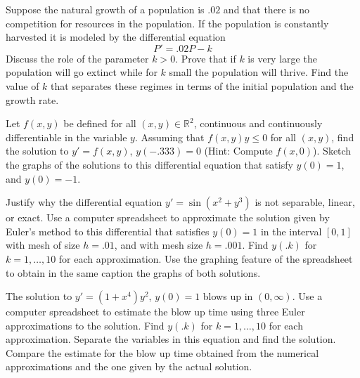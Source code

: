 \documentclass[12pt,letterpaper]{hmcpset}
\newcommand{\RR}{\mathbb{R}}
\begin{document}
\begin{solution}
    \vfill
\end{solution}
\clearpage

\begin{problem}[C5]
    Suppose the natural growth of a population is $.02$
    and that there is no competition for resources in
    the population. If the population is constantly 
    harvested it is modeled by the differential equation
    \[
        P' = .02P - k
    \]
    Discuss the role of the parameter $k > 0$. Prove that 
    if $k$ is very large the population will go extinct 
    while for $k$ small the population will thrive. Find
    the value of $k$ that separates these regimes in terms
    of the initial population and the growth rate.
\end{problem}

\begin{solution}
    \vfill
\end{solution}
\clearpage

\begin{problem}[C6]
    Let $f(x, y)$ be defined for all $(x, y)\in\RR^2$,
    continuous and continuously differentiable in the
    variable $y$. Assuming that $f(x, y)y \leq 0$ for
    all $(x, y)$, find the solution to $y' = f(x, y)$, 
    $y(-.333) = 0$ (Hint: Compute $f(x, 0)$). Sketch
    the graphs of the solutions to this differential 
    equation that satisfy $y(0) = 1$, and $y(0) = -1$.
\end{problem}

\begin{solution}
    \vfill
\end{solution}
\clearpage

\begin{problem}[C7]
    Justify why the differential equation $y' = 
    \sin(x^2+y^3)$ is not separable, linear, or exact.
    Use a computer spreadsheet to approximate the solution
    given by Euler’s method to this differential that
    satisfies $y(0) = 1$ in the interval $[0, 1]$ with 
    mesh of size $h = .01$, and with mesh size $h = .001$.
    Find $y(.k)$ for $k = 1,\dots,10$ for each approximation. 
    Use the graphing feature of the spreadsheet to obtain 
    in the same caption the graphs of both solutions.
\end{problem}

\begin{solution}
    \vfill
\end{solution}
\clearpage

\begin{problem}[C8]
    The solution to $y'=(1+x^4)y^2$, $y(0) = 1$ blows up in
    $(0,\infty)$. Use a computer spreadsheet to estimate
    the blow up time using three Euler approximations to the 
    solution. Find $y(.k)$ for $k = 1,\dots,10$ for each
    approximation. Separate the variables in this equation and 
    find the solution. Compare the estimate for the blow up 
    time obtained from the numerical approximations and the 
    one given by the actual solution.
\end{problem}

\begin{solution}
    \vfill
\end{solution}
\clearpage
\end{document}
